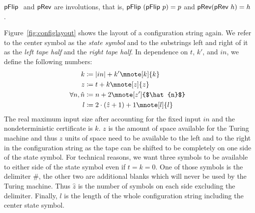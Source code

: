 \begin{fact}[Involutions]\label{fact:prev_involution}
  $\textsf{pFlip}~$ and $\textsf{pRev}{}$ are involutions, that is, $\textsf{pFlip}~(\textsf{pFlip}~p) = p$ and $\textsf{pRev}{(\textsf{pRev}~h)} = h$. 
\end{fact}

Figure~\ref{fig:configlayout} shows the layout of a configuration string again. We refer to the center symbol as the \emph{state symbol} and to the substrings left and right of it as the \emph{left tape half} and the \emph{right tape half}.
In dependence on $t$, $k'$, and $in$, we define the following numbers:
\begin{align*}
  k &\defeq \length{in} + k' \mnote[k]{k}\\
  z &\defeq t + k \mnote[z]{z}\\
  \forall n, \hat{n} &\defeq n + 2 \mnote[z']{$\hat{n}$}\\
  l &\defeq 2 \cdot (\hat{z} + 1) + 1 \mnote[l]{l}
\end{align*}
The real maximum input size after accounting for the fixed input $in$ and the nondeterministic certificate is $k$.
$z$ is the amount of space available for the Turing machine and thus $z$ units of space need to be available to the left and to the right in the configuration string as the tape can be shifted to be completely on one side of the state symbol.
For technical reasons, we want three symbols to be available to either side of the state symbol even if $t = k = 0$. One of those symbols is the delimiter $\#$, the other two are additional blanks which will never be used by the Turing machine. Thus $\hat{z}$ is the number of symbols on each side excluding the delimiter. 
Finally, $l$ is the length of the whole configuration string including the center state symbol.

